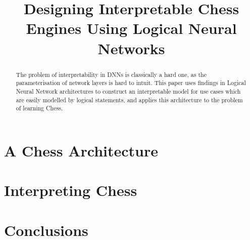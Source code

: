 \documentclass[conference]{report}
\begin{document}
\def\T{\textbf{T}}
\def\F{\textbf{F}}
\def\NOT{\texttt{NOT}}
\def\AND{\texttt{AND}}
\def\OR{\texttt{OR}}
\def\XOR{\texttt{XOR}}
\def\R{\mathbb{R}}
\def\B{\mathbb{B}}
\def\N{\mathbb{N}}

\def\custop#1{{\mspace{4mu}#1\mspace{4mu}}}
\def\concat{\custop{@}}

\title{\LARGE Designing Interpretable Chess Engines Using Logical Neural Networks}

\maketitle
\thispagestyle{plain}
\pagestyle{plain}

\begin{abstract}
The problem of interpretability in DNNs is classically a hard one, as the parameterisation of network layers is hard to intuit. This paper uses findings in Logical Neural Network architectures to construct an interpretable model for use cases which are easily modelled by logical statements, and applies this architecture to the problem of learning Chess.  
\end{abstract}

\tableofcontents

\pagebreak


 


\chapter{A Chess Architecture}

\chapter{Interpreting Chess}

\chapter{Conclusions}
 






\end{document}
